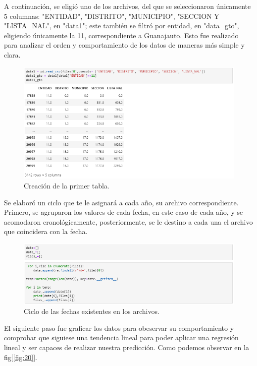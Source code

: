 \documentclass[12pt]{article}
\begin{document}
A continuación, se eligió uno de los archivos, del que se seleccionaron únicamente 5 columnas: "ENTIDAD", "DISTRITO", "MUNICIPIO", "SECCION Y "LISTA\_NAL", en "data1"; este también se filtró por entidad, en "data\_gto", eligiendo únicamente la 11, correspondiente a Guanajauto. Esto fue realizado para analizar el orden y comportamiento de los datos de maneras más simple y clara. 

  \begin{figure}[h] 
  \centering 
    \includegraphics[width=12cm]{Imagen3.png}
        \caption{Creación de la primer tabla.}
        \label{fig:18}
         \end{figure}  

Se elaboró un ciclo que te le asignará a cada año, su archivo correspondiente. Primero, se agruparon los valores de cada fecha, en este caso de cada año, y se acomodaron cronológicamente, posteriormente, se le destino a cada una el archivo que coincidera con la fecha.

    \begin{figure}[h] 
    \centering 
    \includegraphics[width=12cm]{Imagen4.png}
        \caption{Ciclo de las fechas existentes en los archivos.}
        \label{fig:19}
         \end{figure}     

El siguiente paso  fue graficar los datos para obeservar su comportamiento y comprobar que siguiese una tendencia lineal para poder aplicar una regresión lineal y ser capaces de realizar nuestra predicción. Como podemos observar en la fig[\ref{fig:20}].
\end{document}
